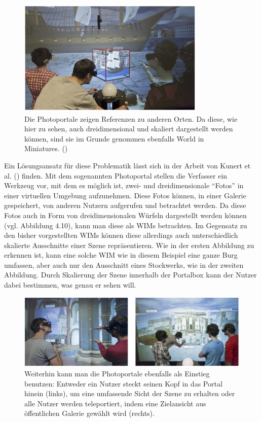 \begin{figure}[h]
  \centering
  \includegraphics[width=0.8\textwidth]{images/ship_pointer.png}
  \caption{Die Photoportale zeigen Referenzen zu anderen Orten. Da diese, wie hier zu sehen, auch dreidimensional und skaliert dargestellt werden können, sind sie im Grunde genommen ebenfalls World in Miniatures. (\cite{Kunert2014Photoportals})}
  \label{fig:todo}
\end{figure}

Ein Lösungsansatz für diese Problematik lässt sich in der Arbeit von Kunert et al. (\cite{Kunert2014Photoportals}) finden.
Mit dem sogenannten Photoportal stellen die Verfasser ein Werkzeug vor, mit dem es möglich ist, zwei- und dreidimensionale “Fotos” in einer virtuellen Umgebung aufzunehmen.
Diese Fotos können, in einer Galerie gespeichert, von anderen Nutzern aufgerufen und betrachtet werden. Da diese Fotos auch in Form von dreidimensionalen Würfeln dargestellt werden können (vgl. Abbildung 4.10), kann man diese als WIMs betrachten.
Im Gegensatz zu den bisher vorgestellten WIMs können diese allerdings auch unterschiedlich skalierte Ausschnitte einer Szene repräsentieren. Wie in der ersten Abbildung zu erkennen ist, kann eine solche WIM wie in diesem Beispiel eine ganze Burg umfassen, aber auch nur den Ausschnitt eines Stockwerks, wie in der zweiten Abbildung. Durch Skalierung der Szene innerhalb der Portalbox kann der Nutzer dabei bestimmen, was genau er sehen will.

\begin{figure}[h]
  \centering
  \includegraphics[width=\textwidth]{images/photoportals.png}
  \caption{Weiterhin kann man die Photoportale ebenfalls als Einstieg benutzen: Entweder ein Nutzer steckt seinen Kopf in das Portal hinein (links), um eine umfassende Sicht der Szene zu erhalten oder alle Nutzer werden teleportiert, indem eine Zielansicht aus öffentlichen Galerie gewählt wird (rechts).}
  \label{fig:todo}
\end{figure}

